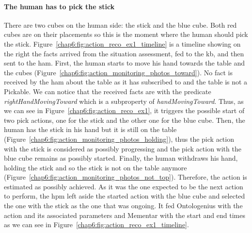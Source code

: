 \documentclass[a4paper,11pt,twoside]{StyleThese}
\begin{document}
\paragraph{The human has to pick the stick} 

There are two cubes on the human side: the stick and the blue cube. Both red cubes are on their placements so this is the moment where the human should pick the stick. Figure~\ref{chap6:fig:action_reco_ex1_timeline} is a timeline showing on the right the facts arrived from the situation assessment, fed to the \acrshort{kb}, and then sent to the \acrshort{ham}. First, the human starts to move his hand towards the table and the cubes (Figure~\ref{chap6:fig:action_monitoring_photos_toward}). No fact is received by the \acrshort{ham} about the table as it has subscribed to  and the table is not a Pickable. We can notice that the received facts are with the predicate \textit{rightHandMovingToward} which is a subproperty of \textit{handMovingToward}. Thus, as we can see in Figure~\ref{chap6:fig:action_reco_ex1}, it triggers the possible start of two pick actions, one for the stick and the other one for the blue cube. Then, the human has the stick in his hand but it is still on the table (Figure~\ref{chap6:fig:action_monitoring_photos_holding}), thus the pick action with the stick is considered as possibly progressing and the pick action with the blue cube remains as possibly started. Finally, the human withdraws his hand, holding the stick and so the stick is not on the table anymore (Figure~\ref{chap6:fig:action_monitoring_photos_not_top}). Therefore, the action is estimated as possibly achieved. As it was the one expected to be the next action to perform, the \acrlong{hpm} left aside the started action with the blue cube and selected the one with the stick as the one that was ongoing. It fed Ontologenius with the action and its associated parameters and Mementar with the start and end times as we can see in Figure~\ref{chap6:fig:action_reco_ex1_timeline}.
\end{document}
